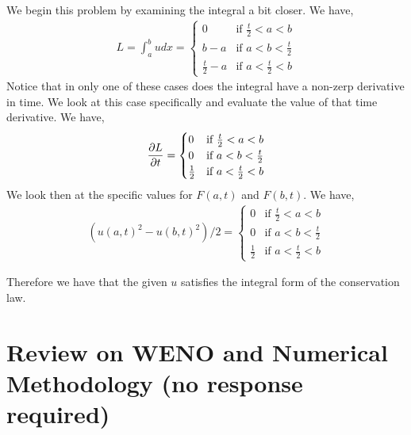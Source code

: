 \documentclass{article}
\begin{document}
We begin this problem by examining the integral a bit closer. We have, 
\begin{gather*}
    L = \int_a^b u dx = \begin{cases}
        0 & \text{if } \frac{t}{2} < a < b\\
        b - a & \text{if } a < b < \frac{t}{2}\\
        \frac{t}{2} - a & \text{if } a< \frac{t}{2} < b\end{cases}
\end{gather*}
Notice that in only one of these cases does the integral have a non-zerp
derivative in time. We look at this case specifically and evaluate the value of
that time derivative. We have, 
\begin{gather*}
    \frac{\partial L}{\partial t} = \begin{cases}
        0 & \text{if } \frac{t}{2} < a < b\\
        0  & \text{if } a < b < \frac{t}{2}\\
        \frac{1}{2} & \text{if } a< \frac{t}{2} < b\end{cases}
\end{gather*}
We look then at the specific values for $F(a,t)$ and $F(b,t)$. We have, 
\begin{gather*}
    \left(u(a,t)^2-u(b,t)^2\right)/2 = \begin{cases}
        0  & \text{if } \frac{t}{2} < a < b\\
        0  & \text{if } a < b < \frac{t}{2}\\
        \frac{1}{2} & \text{if } a< \frac{t}{2} < b\end{cases}
\end{gather*}

Therefore we have that the given $u$ satisfies the integral form of the
conservation law. 


\section{Review on WENO and Numerical Methodology (no response required)}
\end{document}
